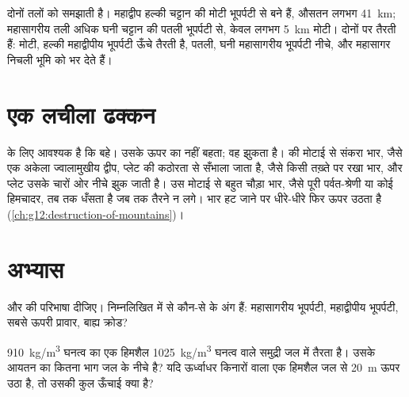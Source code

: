  दोनों तलों को समझाती है। महाद्वीप हल्की चट्टान की मोटी भूपर्पटी से बने हैं,
औसतन लगभग \qty{41}{km}; महासागरीय तली अधिक घनी चट्टान की पतली भूपर्पटी से,
केवल लगभग \qty{5}{km} मोटी। दोनों
 पर तैरती हैं: मोटी, हल्की महाद्वीपीय भूपर्पटी ऊँचे तैरती है, पतली, घनी
महासागरीय भूपर्पटी नीचे, और महासागर निचली भूमि को भर देते हैं।

\section{एक लचीला ढक्कन}

 के लिए आवश्यक है कि  बहे। उसके ऊपर का  नहीं
बहता; वह झुकता है।  की मोटाई से संकरा भार, जैसे
एक अकेला ज्वालामुखीय द्वीप, प्लेट की कठोरता से सँभाला जाता है, जैसे
किसी तख़्ते पर रखा भार, और प्लेट उसके चारों ओर नीचे झुक जाती है। उस मोटाई से
बहुत चौड़ा भार, जैसे पूरी पर्वत-श्रेणी या कोई हिमचादर, तब तक धँसता है जब तक
तैरने न लगे। भार हट जाने पर  धीरे-धीरे फिर ऊपर उठता है
(\cref{ch:g12:destruction-of-mountains})।

\section{अभ्यास}

\begin{exercise}[$\star$]\label{exo:g11:lithosphere-asthenosphere:1}
 और  की परिभाषा दीजिए। निम्नलिखित में से कौन-से
 के अंग हैं: महासागरीय भूपर्पटी, महाद्वीपीय भूपर्पटी, सबसे ऊपरी
प्रावार, बाह्य क्रोड?
\end{exercise}

\begin{exercise}[$\star$]\label{exo:g11:lithosphere-asthenosphere:2}
\qty{910}{kg/m^3} घनत्व का एक हिमशैल \qty{1025}{kg/m^3} घनत्व वाले समुद्री जल में
तैरता है। उसके आयतन का कितना भाग जल के नीचे है? यदि
ऊर्ध्वाधर किनारों वाला एक हिमशैल जल से \qty{20}{m} ऊपर उठा है, तो उसकी
कुल ऊँचाई क्या है?
\end{exercise}


